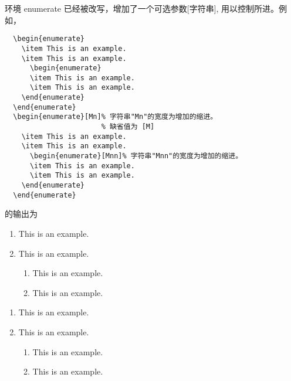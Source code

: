 环境 enumerate 已经被改写，增加了一个可选参数[字符串], 用以控制所进。例如，
\begin{verbatim}
  \begin{enumerate}
    \item This is an example.
    \item This is an example.
      \begin{enumerate}
      \item This is an example.
      \item This is an example.
    \end{enumerate}
  \end{enumerate}
  \begin{enumerate}[Mn]% 字符串"Mn"的宽度为增加的缩进。
                       % 缺省值为 [M]
    \item This is an example.
    \item This is an example.
      \begin{enumerate}[Mnn]% 字符串"Mnn"的宽度为增加的缩进。
      \item This is an example.
      \item This is an example.
    \end{enumerate}
  \end{enumerate}
\end{verbatim}
的输出为
  \begin{enumerate}
    \item This is an example.
    \item This is an example.
      \begin{enumerate}
      \item This is an example.
      \item This is an example.
    \end{enumerate}
  \end{enumerate}
  \begin{enumerate}[Mn]%
    \item This is an example.
    \item This is an example.
      \begin{enumerate}[Mnn]%
      \item This is an example.
      \item This is an example.
    \end{enumerate}
  \end{enumerate}

\clearpage

